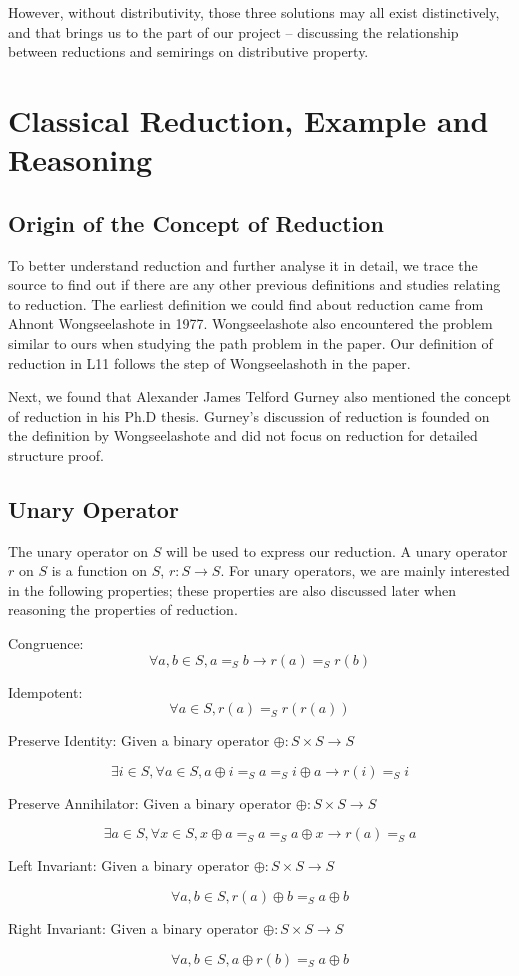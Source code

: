\documentclass[a4paper,12pt,twoside,openright]{report}
\newcommand{\e}[2]{
\begin{equation}
  \label{#1} 
  #2
\end{equation}
}
\begin{document}
However, without distributivity, those three solutions may all exist distinctively,  and that brings us to the part of our project – discussing the relationship between reductions and semirings on distributive property.

\section{Classical Reduction, Example and Reasoning}
\subsection{Origin of the Concept of Reduction}
To better understand reduction and further analyse it in detail, we trace the source to find out if there are any other previous definitions and studies relating to reduction. 
The earliest definition we could find about reduction came from Ahnont Wongseelashote in 1977\cite{WONGSEELASHOTE197955}. Wongseelashote also encountered the problem similar to ours when studying the path problem in the paper. Our definition of reduction in L11 follows the step of Wongseelashoth in the paper.

Next, we found that Alexander James Telford Gurney also mentioned the concept of reduction in his Ph.D thesis\cite{gurney_construction_2010}. Gurney's discussion of reduction is founded on the definition by Wongseelashote and did not focus on reduction for detailed structure proof.

\subsection{Unary Operator}
The unary operator on $S$ will be used to express our reduction. A unary operator $r$ on $S$ is a function on $S$, $r : S \rightarrow S$. 
For unary operators, we are mainly interested in the following properties; these properties are also discussed later when reasoning the properties of reduction.

Congruence: \e{def:uop:congruence}{\forall a,b \in S, a =_S b \rightarrow r(a) =_S r(b)}
Idempotent: \e{def:uop:idempotent}{\forall a \in S, r(a) =_S r(r(a))}
Preserve Identity: Given a binary operator $\oplus : S \times S \rightarrow S$
\e{def:uop:preserve_id}{\exists i \in S, \forall a \in S, a \oplus i =_S a =_S i \oplus a \rightarrow r(i) =_S i}
Preserve Annihilator: Given a binary operator $\oplus : S \times S \rightarrow S$
\e{def:uop:preserve_ann}{\exists a \in S, \forall x \in S, x \oplus a =_S a =_S a \oplus x \rightarrow r(a) =_S a}
Left Invariant: Given a binary operator $\oplus : S \times S \rightarrow S$
\e{def:uop:left_invariant}{\forall a,b \in S, r(a) \oplus b =_S a \oplus b}
Right Invariant: Given a binary operator $\oplus : S \times S \rightarrow S$
\e{def:uop:right_invariant}{\forall a,b \in S, a \oplus r(b) =_S a \oplus b}
\end{document}
